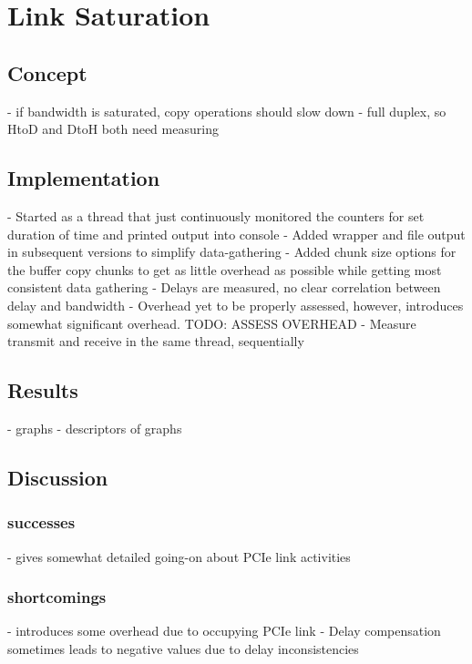 
\chapter{Link Saturation}\label{chapter:copy}

\section{Concept}
- if bandwidth is saturated, copy operations should slow down
- full duplex, so HtoD and DtoH both need measuring

\section{Implementation}

- Started as a thread that just continuously monitored the counters for set duration of time and printed output into console
- Added wrapper and file output in subsequent versions to simplify data-gathering
- Added chunk size options for the buffer copy chunks to get as little overhead as possible while getting most consistent data gathering
- Delays are measured, no clear correlation between delay and bandwidth
- Overhead yet to be properly assessed, however, introduces somewhat significant overhead. TODO: ASSESS OVERHEAD
- Measure transmit and receive in the same thread, sequentially

\section{Results}

- graphs
- descriptors of graphs

\section{Discussion}

\subsection{successes}
- gives somewhat detailed going-on about PCIe link activities
\subsection{shortcomings}
- introduces some overhead due to occupying PCIe link
- Delay compensation sometimes leads to negative values due to delay inconsistencies
